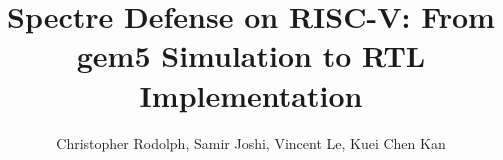 \documentclass[sigplan,screen,10pt]{acmart}
\begin{document}
\setlength{\emergencystretch}{1em}

\title{Spectre Defense on RISC-V: From gem5 Simulation to RTL Implementation}

\author{Christopher Rodolph, Samir Joshi, Vincent Le, Kuei Chen Kan}



\maketitle












\end{document}

